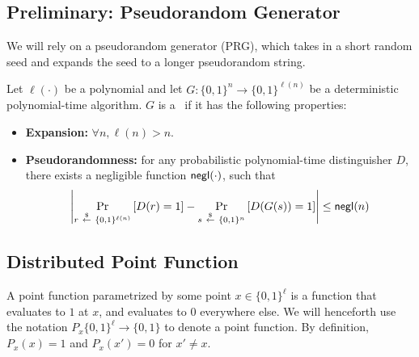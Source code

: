 \subsection{Preliminary: Pseudorandom Generator}
We will rely on a pseudorandom generator (PRG),
which takes in a short random seed and expands
the seed to a longer pseudorandom string.

\begin{definition}[PRG]
    Let $\ell(\cdot)$ be a polynomial and let 
$G:  \{0,1\}^n \rightarrow \{0,1\}^{\ell(n)}$ be a deterministic
    polynomial-time algorithm. $G$ is a \Prg \ if it has the following properties:
    \hfill
    \begin{itemize}
        \item \textbf{Expansion:} $\forall n, \ell(n) > n$.
        \item \textbf{Pseudorandomness:} for any probabilistic polynomial-time distinguisher
$D$, there exists a negligible function ${\sf negl}(\cdot)$, 
such that 
        $$\left|\Pr_{r ~{\overset{\$}{\leftarrow}}~ \{0, 1\}^{\ell(n)}}\left[D(r) = 1\right] - 
\Pr_{s ~{\overset{\$}{\leftarrow}}~ \{0, 1\}^{n}}\left[D(G(s)) = 1\right]\right| \leq {\sf negl}(n)$$ 
    \end{itemize}
\end{definition}

\subsection{Distributed Point Function}

\begin{definition}
A point function parametrized by some point $x \in \{0, 1\}^\ell$ 
is a function that evaluates to $1$ at $x$, and evaluates to $0$ 
everywhere else.
We will henceforth use the notation $P_x \{0,1\}^{\ell} \rightarrow \{0,1\}$
to denote a point function. 
By definition, $P_x(x) = 1$ and $P_x(x') = 0$ for $x' \neq x$.
\end{definition}

